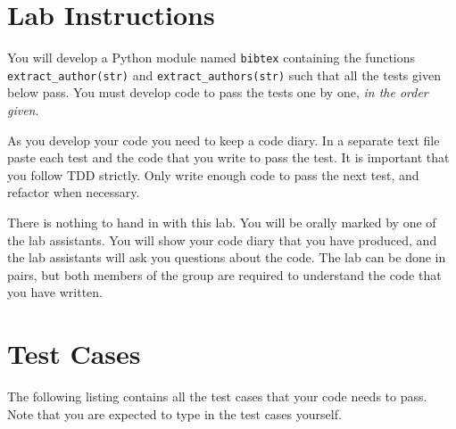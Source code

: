 \documentclass[10pt]{paper}
\begin{document}
\section*{Lab Instructions}
You will develop a Python module named {\tt bibtex} containing the functions
{\tt extract\_author(str)} and {\tt extract\_authors(str)} such that all the tests given below pass. 
You must develop code to pass the tests one by one, \emph{in the order
given}. 

As you develop your code you need to keep a code diary. In a separate text
file paste each test and the code that you write to pass the test. It
is important that you follow TDD strictly. Only write enough code to
pass the next test, and refactor when necessary. 

There is nothing to hand in with this lab. You will be orally marked
by one of the lab assistants. You will show your code diary that you 
have produced,
and the lab assistants will ask you questions about the code. The lab
can be done in pairs, but both members of the group are required to
understand the code that you have written.  


\section*{Test Cases}
The following listing contains all the test cases that your code needs
to pass. Note that you are expected to type in the test cases
yourself.
\end{document}
